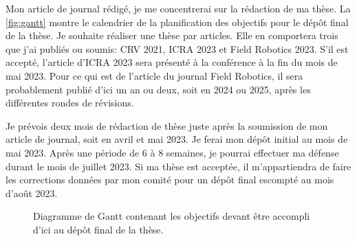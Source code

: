 Mon article de journal rédigé, je me concentrerai sur la rédaction de ma thèse.
La \autoref{fig:gantt} montre le calendrier de la planification des objectifs pour le dépôt final de la thèse.
Je souhaite réaliser une thèse par articles.
Elle en comportera trois que j'ai publiés ou soumis: CRV 2021, ICRA 2023 et Field Robotics 2023.
S'il est accepté, l'article d'ICRA 2023 sera présenté à la conférence à la fin du mois de mai 2023.
Pour ce qui est de l'article du journal Field Robotics, il sera probablement publié d'ici un an ou deux, soit en 2024 ou 2025, après les différentes rondes de révisions.

Je prévois deux mois de rédaction de thèse juste après la soumission de mon article de journal, soit en avril et mai 2023. 
Je ferai mon dépôt initial au mois de mai 2023.
Après une période de 6 à 8 semaines, je pourrai effectuer ma défense durant le mois de juillet 2023.
Si ma thèse est acceptée, il m'appartiendra de faire les corrections données par mon comité pour un dépôt final escompté au mois d'août 2023.

\setlength{\fboxsep}{9pt}
\begin{figure}[htbp]
	\centering
	
	\caption{Diagramme de Gantt contenant les objectifs devant être accompli d'ici au dépôt final de la thèse.
	}
	\label{fig:gantt}
\end{figure}
\setlength{\fboxsep}{12pt}
